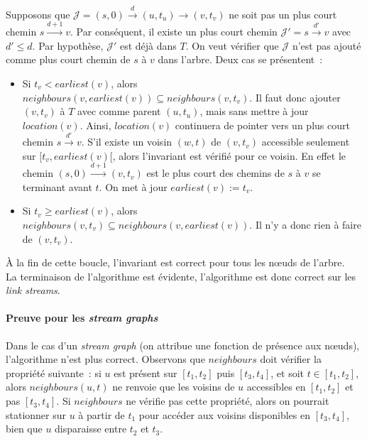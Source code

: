 \documentclass[12pt,a4paper]{article}
\begin{document}
Supposons que
\(\mathcal{J} = (s, 0) \xrightarrow{d} (u, t_u) \rightarrow (v, t_v)\)
ne soit pas un plus court chemin \(s \xrightarrow{d+1} v\). Par
conséquent, il existe un plus court chemin
\(\mathcal{J}' = s \xrightarrow{d'} v\) avec \(d' \leq d\). Par
hypothèse, \(\mathcal{J}'\) est déjà dans \(T\). On veut vérifier que
\(\mathcal{J}\) n'est pas ajouté comme plus court chemin de \(s\) à
\(v\) dans l'arbre. Deux cas se présentent~:
\begin{itemize}
\item Si \(t_v < earliest(v)\), alors
  \(neighbours(v, earliest(v)) \subseteq neighbours(v, t_v)\). Il faut
  donc ajouter \((v, t_v)\) à \(T\) avec comme parent \((u, t_u)\),
  mais sans mettre à jour \(location(v)\). Ainsi, \(location(v)\)
  continuera de pointer vers un plus court chemin
  \(s \xrightarrow{d'} v\). S'il existe un voisin \((w, t)\) de
  \((v, t_v)\) accessible seulement sur \([t_v, earliest(v)[\), alors
  l'invariant est vérifié pour ce voisin. En effet le chemin
  \((s, 0) \xrightarrow{d+1} (v, t_v)\) est le plus court des chemins
  de \(s\) à \(v\) se terminant avant \(t\). On met à jour
  \(earliest(v) := t_v\).
\item Si \(t_v \geq earliest(v)\), alors \(neighbours(v, t_v)
  \subseteq neighbours(v, earliest(v))\). Il n'y a donc rien à faire
  de \((v, t_v)\).
\end{itemize}
À la fin de cette boucle, l'invariant est correct pour tous les nœuds
de l'arbre.\\

La terminaison de l'algorithme est évidente, l'algorithme est donc
correct sur les \textit{link streams}.

\paragraph{Preuve pour les \textit{stream graphs}} Dans le cas d'un
\textit{stream graph} (on attribue une fonction de présence aux
nœuds), l'algorithme n'est plus correct. Observons que \(neighbours\)
doit vérifier la propriété suivante~: si \(u\) est présent sur
\([t_1, t_2]\) puis \([t_3, t_4]\), et soit \(t \in [t_1, t_2]\),
alors \(neighbours(u, t)\) ne renvoie que les voisins de \(u\)
accessibles en \([t_1, t_2]\) et pas \([t_3, t_4]\). Si \(neighbours\)
ne vérifie pas cette propriété, alors on pourrait stationner sur \(u\)
à partir de \(t_1\) pour accéder aux voisins disponibles en
\([t_3, t_4]\), bien que \(u\) disparaisse entre \(t_2\) et \(t_3\).
\end{document}

